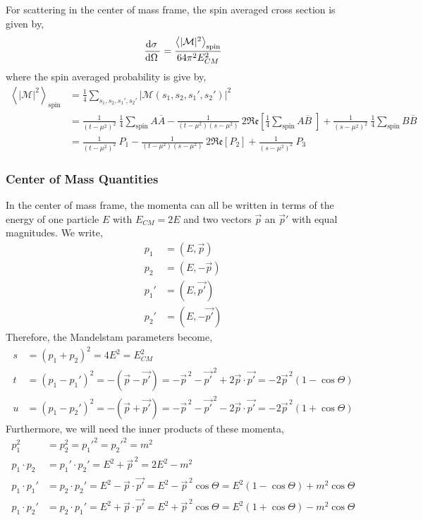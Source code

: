 \documentclass[12pt]{article}
\begin{document}
For scattering in the center of mass frame, the spin averaged cross section is given by,
\[ \frac{\mathrm{d}\sigma \:}{\mathrm{d}\Omega \:} = \frac{ \left< | \mathcal{M} |^2 \right>_{\text{spin}} }{ 64 \pi^2 E_{CM}^2} \]
where the spin averaged probability is give by,
\begin{align*}
 \left< | \mathcal{M} |^2 \right>_{\text{spin}} & = \frac{1}{4} \sum_{s_1, s_2, s_1', s_2'} |\mathcal{M}(s_1, s_2, s_1', s_2') |^2 
\\
& = \frac{1}{(t - \mu^2)^2} \: \frac{1}{4} \sum_{\text{spin}} A \overline{A} - \frac{1}{(t - \mu^2) (s - \mu^2)} \: 2 \mathfrak{Re} \left[ \frac{1}{4} \sum_{\text{spin}}  A \overline{B} \; \right] + \frac{1}{(s - \mu^2)^2} \: \frac{1}{4} \sum_{\text{spin}} B \overline{B}  
\\
 & = \frac{1}{(t - \mu^2)^2} \: P_1 - \frac{1}{(t - \mu^2) (s - \mu^2)} \: 2 \mathfrak{Re} \left[ P_2 \right] + \frac{1}{(s - \mu^2)^2} \: P_3
\end{align*}
\subsubsection{Center of Mass Quantities}

In the center of mass frame, the momenta can all be written in terms of the energy of one particle $E$ with $E_{CM} = 2 E$ and two vectors $\vec{p}$ an $\vec{p}'$ with equal magnitudes. We write,
\begin{align*}
p_1 & = (E, \vec{p}) \\
p_2 & = (E, - \vec{p}) \\
p_1' & = (E, \vec{p'}) \\
p_2' & = (E, - \vec{p'})
\end{align*}
Therefore, the Mandelstam parameters become,
\begin{align*}
s & = (p_1 + p_2)^2 = 4 E^2 = E_{CM}^2 \\
t & = (p_1 - p_1')^2 = - (\vec{p} - \vec{p'}) = - \vec{p}^{\, 2} - \vec{p'}^{\, 2} + 2 \vec{p} \cdot \vec{p'} = - 2 \vec{p}^{\, 2} (1 - \cos{\Theta}) \\
u & = (p_1 - p_2')^2 = - (\vec{p} + \vec{p'}) = - \vec{p}^{\, 2} - \vec{p'}^{\, 2} - 2 \vec{p} \cdot \vec{p'} = - 2 \vec{p}^{\, 2} (1 + \cos{\Theta})
\end{align*}
Furthermore, we will need the inner products of these momenta,
\begin{align*}
p_1^2 & = p_2^2 = p_1'^2 = p_2'^2 = m^2 \\
p_1 \cdot p_2 & = p_1' \cdot p_2' = E^2 + \vec{p}^{\, 2} = 2 E^2 - m^2 \\
p_1 \cdot p_1'& = p_2 \cdot p_2' = E^2 - \vec{p} \cdot \vec{p'} = E^2 - \vec{p}^{\, 2} \cos{\Theta} = E^2 (1 - \cos{\Theta}) + m^2 \cos{\Theta}  \\
p_1 \cdot p_2'& = p_2 \cdot p_1' = E^2 + \vec{p} \cdot \vec{p'} = E^2 + \vec{p}^{\, 2} \cos{\Theta} = E^2 (1 + \cos{\Theta}) - m^2 \cos{\Theta} 
\end{align*}
\end{document}
